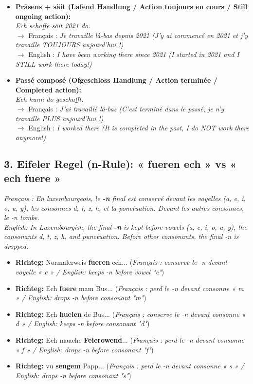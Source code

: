 \begin{itemize}
    \item \textbf{Präsens + säit (Lafend Handlung / Action toujours en cours / Still ongoing action):}\\
    \textit{Ech schaffe säit 2021 do.}\\
    $\rightarrow$ Français : \textit{Je travaille là-bas depuis 2021 (J'y ai commencé en 2021 et j'y travaille TOUJOURS aujourd'hui !)}\\
    $\rightarrow$ English : \textit{I have been working there since 2021 (I started in 2021 and I STILL work there today!)}
    
    \item \textbf{Passé composé (Ofgeschloss Handlung / Action terminée / Completed action):}\\
    \textit{Ech hunn do geschafft.}\\
    $\rightarrow$ Français : \textit{J'ai travaillé là-bas (C'est terminé dans le passé, je n'y travaille PLUS aujourd'hui !)}\\
    $\rightarrow$ English : \textit{I worked there (It is completed in the past, I do NOT work there anymore!)}
\end{itemize}

\subsection*{3. Eifeler Regel (n-Rule): « fueren ech » vs « ech fuere »}

\noindent\textit{Français : En luxembourgeois, le \textbf{-n} final est conservé devant les voyelles (a, e, i, o, u, y), les consonnes d, t, z, h, et la ponctuation. Devant les autres consonnes, le -n tombe.}\\
\textit{English: In Luxembourgish, the final \textbf{-n} is kept before vowels (a, e, i, o, u, y), the consonants d, t, z, h, and punctuation. Before other consonants, the final -n is dropped.}

\begin{itemize}
    \item \textbf{Richteg:} Normalerweis \textbf{fueren} ech... (\textit{Français : conserve le -n devant voyelle « e » / English: keeps -n before vowel "e"})
    \item \textbf{Richteg:} Ech \textbf{fuere} mam Bus... (\textit{Français : perd le -n devant consonne « m » / English: drops -n before consonant "m"})
    \item \textbf{Richteg:} Ech \textbf{huelen} de Bus... (\textit{Français : conserve le -n devant consonne « d » / English: keeps -n before consonant "d"})
    \item \textbf{Richteg:} Ech maache \textbf{Feierowend}... (\textit{Français : perd le -n devant consonne « f » / English: drops -n before consonant "f"})
    \item \textbf{Richteg:} vu \textbf{sengem} Papp... (\textit{Français : perd le -n devant consonne « s » / English: drops -n before consonant "s"})
\end{itemize}

